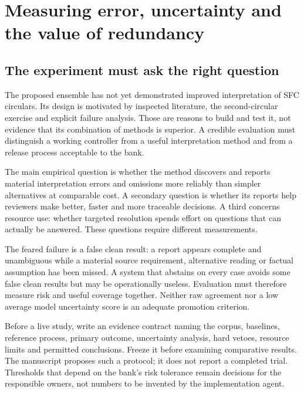 \chapter{Measuring error, uncertainty and the value of redundancy}
\label{ch:evaluation}

\section{The experiment must ask the right question}
\label{merge:M09:00}


The proposed ensemble has not yet demonstrated improved interpretation of SFC
circulars. Its design is motivated by inspected literature, the second-circular
exercise and explicit failure analysis. Those are reasons to build and test it,
not evidence that its combination of methods is superior. A credible evaluation
must distinguish a working controller from a useful interpretation method and
from a release process acceptable to the bank.

The main empirical question is whether the method discovers and reports material
interpretation errors and omissions more reliably than simpler alternatives at
comparable cost. A secondary question is whether its reports help reviewers make
better, faster and more traceable decisions. A third concerns resource use:
whether targeted resolution spends effort on questions that can actually be
answered. These questions require different measurements.


The feared failure is a false clean result: a report appears complete and
unambiguous while a material source requirement, alternative reading or factual
assumption has been missed. A system that abstains on every case avoids some false
clean results but may be operationally useless. Evaluation must therefore measure
risk and useful coverage together. Neither raw agreement nor a low average model
uncertainty score is an adequate promotion criterion.

Before a live study, write an evidence contract naming the corpus, baselines,
reference process, primary outcome, uncertainty analysis, hard vetoes, resource
limits and permitted conclusions. Freeze it before examining comparative results.
The manuscript proposes such a protocol; it does not report a completed trial.
Thresholds that depend on the bank's risk tolerance remain decisions for the
responsible owners, not numbers to be invented by the implementation agent.

